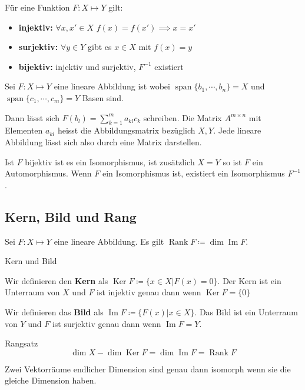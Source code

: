 \documentclass[a4paper,10pt]{article}
\DeclareMathOperator{\Rank}{Rank}
\DeclareMathOperator{\Image}{Im}
\DeclareMathOperator{\Kernel}{Ker}
\DeclareMathOperator{\Span}{span}
\begin{document}
Für eine Funktion $F: X \mapsto Y$ gilt:
\begin{itemize}
  \item \textbf{injektiv:} $\forall x, x' \in X$ $f(x) = f(x') \implies x = x'$
  \item \textbf{surjektiv:} $\forall y \in Y$ gibt es $x \in X$ mit $f(x) = y$
  \item \textbf{bijektiv:} injektiv und surjektiv, $F^{-1}$ existiert
\end{itemize}

Sei $F: X \mapsto Y$ eine lineare Abbildung ist wobei $\Span \{ b_1, \cdots, b_n \} = X$ und $\Span \{ c_1, \cdots, c_m \} = Y$ Basen sind.

Dann lässt sich $F(b_l) = \sum_{k=1}^m a_{kl} c_k$ schreiben. Die Matrix $A^{m \times n}$ mit Elementen $a_{kl}$ heisst die Abbildungsmatrix bezüglich $X, Y$. Jede lineare Abbildung lässt sich also durch eine Matrix darstellen.

Ist $F$ bijektiv ist es ein Isomorphismus, ist zusätzlich $X = Y$ so ist $F$ ein Automorphismus. Wenn $F$ ein Isomorphismus ist, existiert ein Isomorphismus $F^{-1}$.

\subsection{Kern, Bild und Rang}


Sei $F: X \mapsto Y$ eine lineare Abbildung. Es gilt $\Rank F \coloneqq \dim \Image F$.

\begin{mainbox}{Kern und Bild}

  Wir definieren den \textbf{Kern} als $\Kernel F \coloneqq \{x \in X | F(x) = 0\}$. Der Kern ist ein Unterraum von $X$ und $F$ ist injektiv genau dann wenn $\Kernel F = \{0\}$

  Wir definieren das \textbf{Bild} als $\Image F \coloneqq \{F(x) | x \in X\}$. Das Bild ist ein Unterraum von $Y$ und $F$ ist surjektiv genau dann wenn $\Image F = Y$.
\end{mainbox}

\begin{mainbox}{Rangsatz}
  $$\dim X - \dim \Kernel F = \dim \Image F = \Rank F$$
\end{mainbox}

Zwei Vektorräume endlicher Dimension sind genau dann isomorph wenn sie die gleiche Dimension haben.
\end{document}
